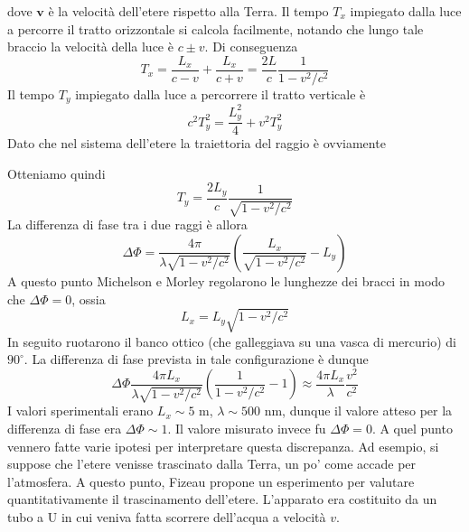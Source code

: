 \documentclass[a4paper,11pt]{book}
\renewcommand{\vec}[1]{\mathbf{#1}}
\theoremstyle{theorem}
\theoremstyle{definition}
\begin{document}
\noindent dove $\vec{v}$ è la velocità dell'etere rispetto alla Terra. Il tempo $T_x$ impiegato dalla luce a percorre il tratto orizzontale si calcola facilmente, notando che lungo tale braccio la velocità della luce è $c\pm v$. Di conseguenza
\[T_x=\frac{L_x}{c-v}+\frac{L_x}{c+v}=\frac{2L}{c}\frac{1}{1-v^2/c^2}\]Il tempo $T_y$ impiegato dalla luce a percorrere il tratto verticale è
\[c^2T_y^2=\frac{L_y^2}{4}+v^2T_y^2\]
Dato che nel sistema dell'etere la traiettoria del raggio è ovviamente
\begin{figure}[h]
	\centering
\end{figure}
Otteniamo quindi
\[T_y=\frac{2L_y}{c}\frac{1}{\sqrt{1-v^2/c^2}}\]
La differenza di fase tra i due raggi è allora
\[\Delta\Phi=\frac
{4\pi}{\lambda\sqrt{1-v^2/c^2}}\left(\frac{L_x}{\sqrt{1-v^2/c^2}}-L_y\right)\]
A questo punto Michelson e Morley regolarono le lunghezze dei bracci in modo che $\Delta\Phi=0$, ossia
\[L_x=L_y\sqrt{1-v^2/c^2}\]
In seguito ruotarono il banco ottico (che galleggiava su una vasca di mercurio) di $90^\circ$. La differenza di fase prevista in tale configurazione è dunque
\[\Delta\Phi\frac{4\pi L_x}{\lambda\sqrt{1-v^2/c^2}}\left(\frac{1}{1-v^2/c^2}-1\right)\approx\frac{4\pi L_x}{\lambda}\frac{v^2}{c^2}\]
I valori sperimentali erano $L_x\sim 5$ m, $\lambda\sim 500$ nm, dunque il valore atteso per la differenza di fase era $\Delta\Phi\sim1$. Il valore misurato invece fu $\Delta\Phi=0$. A quel punto vennero fatte varie ipotesi per interpretare questa discrepanza. Ad esempio, si suppose che l'etere venisse trascinato dalla Terra, un po' come accade per l'atmosfera. A questo punto, Fizeau propone un esperimento per valutare quantitativamente il trascinamento dell'etere. L'apparato era costituito da un tubo a U in cui veniva fatta scorrere dell'acqua a velocità $v$.
\end{document}

